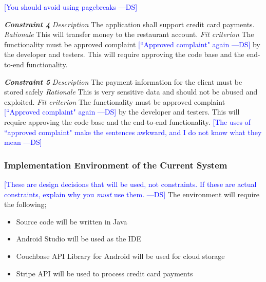 \documentclass[12pt, titlepage]{article}
\newcommand{\authornote}[3]{\textcolor{#1}{[#3 ---#2]}}
\newcommand{\authornote}[3]{}
\newcommand{\ds}[1]{\authornote{blue}{DS}{#1}}
\begin{document}
\ds{You should avoid using pagebreaks}

\pagebreak 
\noindent\textbf{\textit{Constraint 4}}
\newline
\textit{Description}\newline
The application shall support credit card payments. \newline\newline
\textit{Rationale}\newline
This will transfer money to the restaurant account. \newline\newline
\textit{Fit criterion}\newline
The functionality must be approved complaint \ds{``Approved complaint" again} by the developer and testers. This will require approving the code base and the end-to-end functionality.\newline\newline

\noindent\textbf{\textit{Constraint 5}}
\newline
\textit{Description}\newline
The payment information for the client must be stored safely \newline\newline
\textit{Rationale}\newline
This is very sensitive data and should not be abused and exploited. \newline\newline
\textit{Fit criterion}\newline
The functionality must be approved complaint \ds{``Approved complaint" again} by the developer and testers. This will require approving the code base and the end-to-end functionality.
\ds{The uses of ``approved complaint" make the sentences awkward, and I do not know what they mean}\newline\newline

\subsubsection{Implementation Environment of the Current System}
\ds{These are design decisions that will be used, not constraints. If these are
actual constraints, explain why you \emph{must} use them.}
The environment will require the following;
\begin{itemize}
  \item Source code will be written in Java
  \item Android Studio will be used as the IDE
  \item 	Couchbase API Library for Android will be used for cloud storage
  \item 	Stripe API will be used to process credit card payments
\end{itemize}
\end{document}
